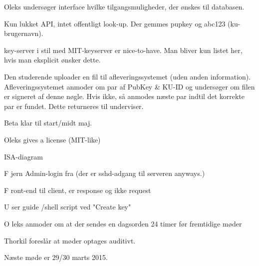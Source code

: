 \documentclass[11pt,a4paper]{article}
\let\OldItem\item
\newcommand{\SubItemStart}[1]{%
    \let\item\SubItemEnd
    \begin{SubItemList}[resume]%
        \OldItem #1%
}
\newcommand{\SubItemMiddle}[1]{%
    \OldItem #1%
}
\newcommand{\SubItemEnd}[1]{%
    \end{SubItemList}%
    \let\item\OldItem
    \item #1%
}
\newcommand*{\SubItem}[1]{%
    \let\SubItem\SubItemMiddle%
    \SubItemStart{#1}%
}%
\begin{document}
\begin{itemize}
\item Oleks undersøger interface hvilke tilgangsmuligheder, der ønskes til databasen.
\item Kun lukket API, intet offentligt look-up. Der gemmes pupkey og abc123 (ku-brugernavn).
\item key-server i stil med MIT-keyserver er nice-to-have. Man bliver kun listet her, hvis man eksplicit ønsker dette.
\item Den studerende uploader en fil til afleveringssystemet (uden anden information). Afleveringssystemet anmoder om par af PubKey \& KU-ID og undersøger om filen er signeret af denne nøgle. Hvis ikke, så anmodes næste par indtil det korrekte par er fundet. Dette returneres til underviser.
\item Beta klar til start/midt maj.
\item Oleks gives a license (MIT-like)
\item ISA-diagram
\SubItem Fjern Admin-login fra (der er sshd-adgang til serveren anyways.)
\SubItem Front-end til client, er response og ikke request
\SubItem User guide /shell script ved "Create key"
\item Oleks anmoder om at der sendes en dagsorden 24 timer før fremtidige møder
\item Thorkil foreslår at møder optages auditivt.
\end{itemize}

Næste møde er 29/30 marts 2015.
\end{document}
